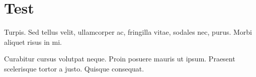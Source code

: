 \section{Test} %
\label{sec:Test}

Turpis. Sed tellus velit, ullamcorper ac, fringilla vitae,
sodales nec, purus. Morbi aliquet risus in mi.

Curabitur cursus volutpat neque. Proin posuere mauris ut
ipsum. Praesent scelerisque tortor a justo. Quisque consequat.

